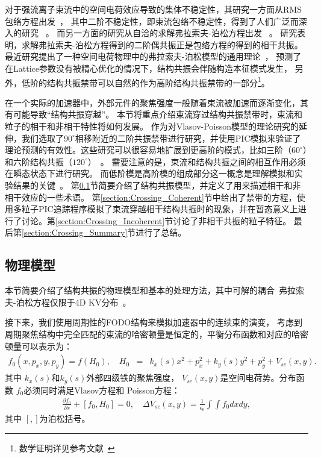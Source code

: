 对于强流离子束流中的空间电荷效应导致的集体不稳定性，其研究一方面从RMS包络方程出发~\cite{sacherer1971rms}，
其中二阶不稳定性，即束流包络不稳定性，得到了人们广泛而深入的研究 ~\cite{14,15,16,17,21,22}。
而另一方面的研究从自洽的求解弗拉索夫-泊松方程出发 ~\cite{11,12,18,19}。
研究表明，求解弗拉索夫-泊松方程得到的二阶偶共振正是包络方程的得到的相干共振。
最近研究提出了一种空间电荷物理中的弗拉索夫-泊松模型的通用理论~\cite{11, 12}，
预测了在Lattice参数没有被精心优化的情况下，结构共振会伴随构造本征模式发生，
另外，低阶的结构共振禁带可以自然的作为高阶结构共振禁带的一部分\footnote{数学证明详见参考文献~\cite{12}}。

在一个实际的加速器中，外部元件的聚焦强度一般随着束流被加速而逐渐变化，其有可能导致“结构共振穿越”。
本节将重点介绍束流穿过结构共振禁带时，束流和粒子的相干和非相干特性将如何发展。
作为对Vlasov-Poisson模型的理论研究的延伸，我们选取了$90^{\circ}$相移附近的二阶共振禁带进行研究，并使用PIC模拟来验证了理论预测的有效性。这些研究可以很容易地扩展到更高阶的模式，比如三阶（$60^{\circ}$）和六阶结构共振（$120^{\circ}$）~\cite{36,40}。
需要注意的是，束流和结构共振之间的相互作用必须在瞬态状态下进行研究。
而低阶模是高阶模的组成部分这一概念是理解模拟和实验结果的关键~\cite{groening2009experimental,33}。
第\ref{section:Crossing_model}节简要介绍了结构共振模型，并定义了用来描述相干和非相干效应的一些术语。
第\ref{section:Crossing_Coherent}节中给出了禁带的方程，使用多粒子PIC追踪程序模拟了束流穿越相干结构共振时的现象，并在暂态意义上进行了讨论。第\ref{section:Crossing_Incoherent}节讨论了非相干共振的粒子特征。
最后第\ref{section:Crossing_Summary}节进行了总结。

\subsection{物理模型}
\label{section:Crossing_model}
本节简要介绍了结构共振的物理模型和基本的处理方法，其中可解的耦合~弗拉索夫-泊松方程仅限于4D KV分布~\cite{20}。

接下来，我们使用周期性的FODO结构来模拟加速器中的连续束的演变， 考虑到周期聚焦结构中完全匹配的束流的哈密顿量是恒定的，平衡分布函数和对应的哈密顿量可以表示为：
\begin{eqnarray}\label{eq2.1}
  f_0(x,p_x,y,p_y) =f(H_0),  \quad  H_0&=&k_x(s)x^2+p_x^2+k_y(s)y^2+p_y^2+V_{sc}(x,y).
\end{eqnarray}
其中 $k_x(s)$和$k_y(s)$外部四级铁的聚焦强度， $V_{sc}(x,y)$是空间电荷势。分布函数 $f_0$必须同时满足Vlasov方程和 Poisson方程：
\begin{eqnarray}\label{eq2.2}
\frac{\partial f_0}{\partial s} + [f_0,H_0]=0,   \quad \Delta V_{sc}(x,y)  = \frac{1}{\epsilon_0}  \int \int f_0 dxdy,
\end{eqnarray}
其中 $[,]$为泊松括号。

